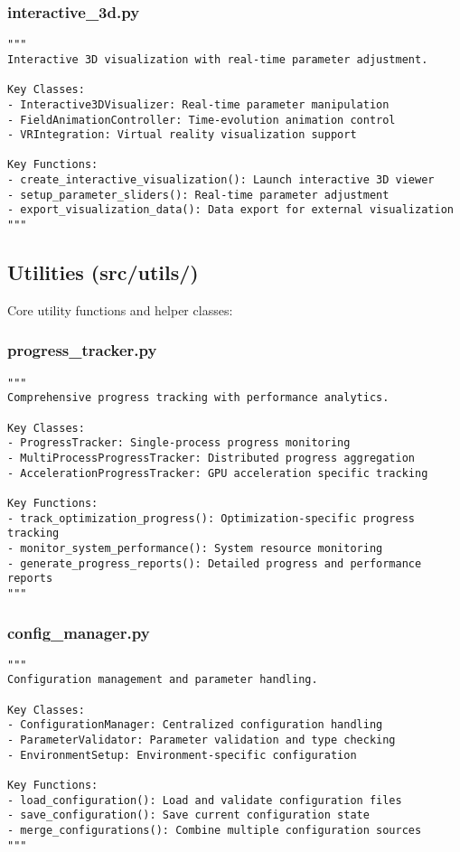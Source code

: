 \documentclass{article}
\begin{document}
\subsubsection{interactive\_3d.py}
\begin{lstlisting}
"""
Interactive 3D visualization with real-time parameter adjustment.

Key Classes:
- Interactive3DVisualizer: Real-time parameter manipulation
- FieldAnimationController: Time-evolution animation control
- VRIntegration: Virtual reality visualization support

Key Functions:
- create_interactive_visualization(): Launch interactive 3D viewer
- setup_parameter_sliders(): Real-time parameter adjustment
- export_visualization_data(): Data export for external visualization
"""
\end{lstlisting}

\subsection{Utilities (src/utils/)}

Core utility functions and helper classes:

\subsubsection{progress\_tracker.py}
\begin{lstlisting}
"""
Comprehensive progress tracking with performance analytics.

Key Classes:
- ProgressTracker: Single-process progress monitoring
- MultiProcessProgressTracker: Distributed progress aggregation
- AccelerationProgressTracker: GPU acceleration specific tracking

Key Functions:
- track_optimization_progress(): Optimization-specific progress tracking
- monitor_system_performance(): System resource monitoring
- generate_progress_reports(): Detailed progress and performance reports
"""
\end{lstlisting}

\subsubsection{config\_manager.py}
\begin{lstlisting}
"""
Configuration management and parameter handling.

Key Classes:
- ConfigurationManager: Centralized configuration handling
- ParameterValidator: Parameter validation and type checking
- EnvironmentSetup: Environment-specific configuration

Key Functions:
- load_configuration(): Load and validate configuration files
- save_configuration(): Save current configuration state
- merge_configurations(): Combine multiple configuration sources
"""
\end{lstlisting}
\end{document}
